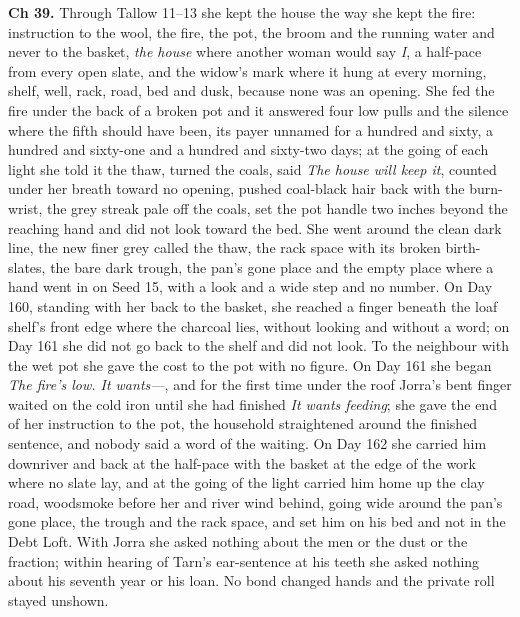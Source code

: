 \documentclass{design/chronicle}
\begin{document}
{\textbf{Ch 39.} Through Tallow 11–13 she kept the house the way she kept the fire: instruction to the wool, the fire, the pot, the broom and the running water and never to the basket, \emph{the house} where another woman would say \emph{I}, a half-pace from every open slate, and the widow’s mark where it hung at every morning, shelf, well, rack, road, bed and dusk, because none was an opening. She fed the fire under the back of a broken pot and it answered four low pulls and the silence where the fifth should have been, its payer unnamed for a hundred and sixty, a hundred and sixty-one and a hundred and sixty-two days; at the going of each light she told it the thaw, turned the coals, said \emph{The house will keep it}, counted under her breath toward no opening, pushed coal-black hair back with the burn-wrist, the grey streak pale off the coals, set the pot handle two inches beyond the reaching hand and did not look toward the bed. She went around the clean dark line, the new finer grey called the thaw, the rack space with its broken birth-slates, the bare dark trough, the pan’s gone place and the empty place where a hand went in on Seed 15, with a look and a wide step and no number. On Day 160, standing with her back to the basket, she reached a finger beneath the loaf shelf’s front edge where the charcoal lies, without looking and without a word; on Day 161 she did not go back to the shelf and did not look. To the neighbour with the wet pot she gave the cost to the pot with no figure. On Day 161 she began \emph{The fire’s low. It wants---}, and for the first time under the roof Jorra’s bent finger waited on the cold iron until she had finished \emph{It wants feeding}; she gave the end of her instruction to the pot, the household straightened around the finished sentence, and nobody said a word of the waiting. On Day 162 she carried him downriver and back at the half-pace with the basket at the edge of the work where no slate lay, and at the going of the light carried him home up the clay road, woodsmoke before her and river wind behind, going wide around the pan’s gone place, the trough and the rack space, and set him on his bed and not in the Debt Loft. With Jorra she asked nothing about the men or the dust or the fraction; within hearing of Tarn’s ear-sentence at his teeth she asked nothing about his seventh year or his loan. No bond changed hands and the private roll stayed unshown.

}
\end{document}
